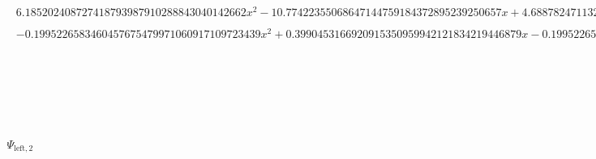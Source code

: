 \documentclass{article}
\begin{document}
\begin{landscape}
\begin{eqnarray*}
\begin{array}{cc}
\begin{array}{cc}
 6.185202408727418793987910288843040142662 x^2-10.77422355068647144759184372895239250657 x+4.688782471132075537377931993155207850083 & \left(x\geq \frac{3}{4}\land x<\frac{13}{16}\right)\lor \left(x\geq \frac{13}{16}\land x<\frac{7}{8}\right) \\
 -0.1995226583460457675479971060917109723439 x^2+0.3990453166920915350959942121834219446879 x-0.1995226583460457675479971060917109723439 & \left(x\geq \frac{7}{8}\land x<\frac{15}{16}\right)\lor \left(x\geq \frac{15}{16}\land x<1\right)
\end{array}

\end{array}\\
\Psi_{\text{left},2} & = & \begin{array}{cc}
 \{ & 
\begin{array}{cc}
 224.4846780119161287108089368588587601271 x-3179.675866412598377051250552119276030158 x^2 & x\geq 0\land x<\frac{1}{16} \\
 1796.861337444514304482003388041023848016 x^2-397.5824724702229564808478056611787246446 x+19.43959845256684641223927320375117139912 & x\geq \frac{1}{16}\land x<\frac{1}{8} \\
 -211.2854768281289775128995066450854894728 x^2+109.1091730352875682444651319447249408824 x-13.03711371314757295822604029462211412899 & x\geq \frac{1}{4}\land x<\frac{5}{16} \\
 152.6494340018819891597262924531255191512 x^2-118.3501462334692859259259924916569395076 x+22.50340492259568550589757289856255468195 & x\geq \frac{5}{16}\land x<\frac{3}{8} \\
 -221.6726312484963745982118549021100897554 x^2+107.0510197030297132892060050746047597982 x-12.09999480826144544838908996723529637856 & x\geq \frac{1}{8}\land x<\frac{3}{16} \\
 -163.6587869089639466148894469130502399507 x^2+85.29582807570505279546010207870731612141 x-10.06044559319975852710041156136991103386 & x\geq \frac{3}{16}\land x<\frac{1}{4} \\
 44.13579077758276013131260377007744338972 x^2-36.96491381524486415461572597937088268645 x+7.243673844178606423776897927508919027987 & x\geq \frac{3}{8}\land x<\frac{7}{16} \\
 59.28850033990944686925203056832250869812 x^2-50.22353468228071505031272442783531483130 x+10.14399715884269880721061633811051355967 & x\geq \frac{7}{16}\land x<\frac{1}{2} \\
 -52.42277323520773335206043577407992697748 x^2+61.48773889283646517099974191456712084430 x-17.78382123493659624811750024749009535923 & \left(x\geq \frac{1}{2}\land x<\frac{9}{16}\right)\lor \left(x\geq \frac{9}{16}\land x<\frac{5}{8}\right) \\

\end{array}
\end{array}
\end{eqnarray*}
\end{landscape}
\end{document}
